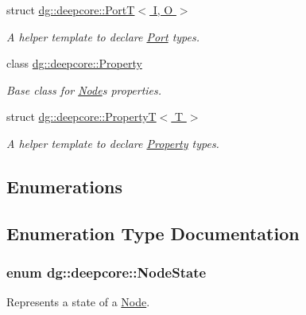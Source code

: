 \begin{DoxyCompactItemize}
struct \hyperlink{structdg_1_1deepcore_1_1_port_t}{dg\+::deepcore\+::\+Port\+T$<$ I, O $>$}
\begin{DoxyCompactList}\small\item\em A helper template to declare \hyperlink{classdg_1_1deepcore_1_1_port}{Port} types. \end{DoxyCompactList}\item 
class \hyperlink{classdg_1_1deepcore_1_1_property}{dg\+::deepcore\+::\+Property}
\begin{DoxyCompactList}\small\item\em Base class for \hyperlink{classdg_1_1deepcore_1_1_node}{Node}\textquotesingle{}s properties. \end{DoxyCompactList}\item 
struct \hyperlink{structdg_1_1deepcore_1_1_property_t}{dg\+::deepcore\+::\+Property\+T$<$ T $>$}
\begin{DoxyCompactList}\small\item\em A helper template to declare \hyperlink{classdg_1_1deepcore_1_1_property}{Property} types. \end{DoxyCompactList}\end{DoxyCompactItemize}
\subsection*{Enumerations}


\subsection{Enumeration Type Documentation}
\subsubsection[{\texorpdfstring{Node\+State}{NodeState}}]{\setlength{\rightskip}{0pt plus 5cm}enum {\bf dg\+::deepcore\+::\+Node\+State}\hspace{0.3cm}{\ttfamily [strong]}}\hypertarget{group___process_framework_ga6cb7b5530ce6ccea164f9157b5b2cc0a}{}\label{group___process_framework_ga6cb7b5530ce6ccea164f9157b5b2cc0a}


Represents a state of a \hyperlink{classdg_1_1deepcore_1_1_node}{Node}. 

